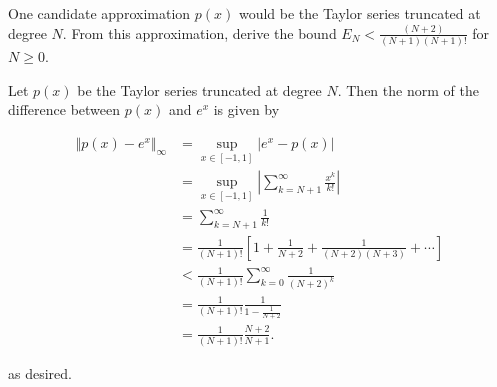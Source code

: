 One candidate approximation $p(x)$ would be the Taylor series truncated at degree $N$. From this approximation, derive
the bound $E_N < \frac{(N+2)}{(N+1)(N+1)!}$ for $N \ge 0$.

\begin{solution}
  Let $p(x)$ be the Taylor series truncated at degree $N$. Then the norm of the difference between $p(x)$ and $e^x$ is
  given by

  \begin{align*}
    \Vert p(x) - e^x \Vert_{\infty} &= \sup\limits_{x \in [-1,1]} \left| e^x - p(x) \right| \\
                                    &= \sup\limits_{x \in [-1,1]} \left| \sum\limits_{k=N+1}^{\infty}{\frac{x^k}{k!}} \right| \\
                                    &= \sum\limits_{k=N+1}^{\infty}{\frac{1}{k!}} \\
                                    &= \frac{1}{(N+1)!} \left[1 + \frac{1}{N + 2} + \frac{1}{(N + 2)(N + 3)} + \cdots \right] \\
                                    &< \frac{1}{(N+1)!} \sum\limits_{k=0}^{\infty}{\frac{1}{(N + 2)^k}} \\
                                    &= \frac{1}{(N+1)!} \frac{1}{1 - \frac{1}{N + 2}} \\
                                    &= \frac{1}{(N+1)!} \frac{N + 2}{N + 1}.
  \end{align*}

  as desired.

  \ \\
\end{solution}